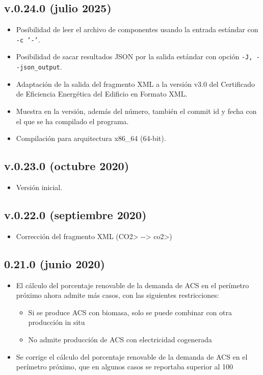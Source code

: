 \documentclass[10pt,notitlepage,oneside,a4paper]{article}
\begin{document}
\subsection{v.0.24.0 (julio 2025)}

\begin{itemize}
\item Posibilidad de leer el archivo de componentes usando la entrada estándar con \texttt{-c '-'}.
\item Posibilidad de sacar resultados JSON por la salida estándar con opción \texttt{-J, -{}-json\_output}.
\item Adaptación de la salida del fragmento XML a la versión v3.0 del Certificado de Eficiencia Energética del Edificio en Formato XML.
\item Muestra en la versión, además del número, también el commit id y fecha con el que se ha compilado el programa.
\item Compilación para arquitectura x86\_64 (64-bit).
\end{itemize}

\subsection{v.0.23.0 (octubre 2020)}

\begin{itemize}
\item Versión inicial.
\end{itemize}

\subsection{v.0.22.0 (septiembre 2020)}

\begin{itemize}
\item  Corrección del fragmento XML (\<CO2> -{}-> \<co2>)
\end{itemize}

\subsection{0.21.0 (junio 2020)}

\begin{itemize}
\item  El cálculo del porcentaje renovable de la demanda de ACS en el perímetro próximo ahora admite más casos, con las siguientes restricciones:
  \begin{itemize}
  \item  Si se produce ACS con biomasa, solo se puede combinar con otra producción in situ
  \item  No admite producción de ACS con electricidad cogenerada
  \end{itemize}
\item  Se corrige el cálculo del porcentaje renovable de la demanda de ACS en el perímetro próximo, que en algunos casos se reportaba superior al 100%
\end{itemize}
\end{document}
